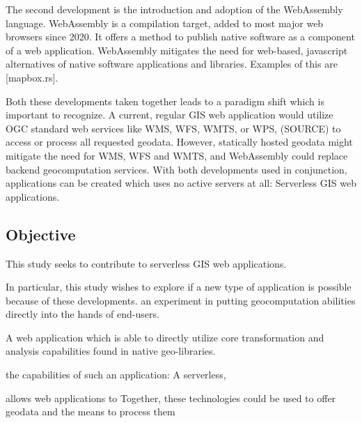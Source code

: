 The second development is the introduction and adoption of the WebAssembly language. 
WebAssembly is a compilation target, added to most major web browsers since 2020. 
It offers a method to publish native software as a component of a web application. 
WebAssembly mitigates the need for web-based, javascript alternatives of native software applications and libraries. 
Examples of this are [mapbox.rs].


Both these developments taken together leads to a paradigm shift which is important to recognize.
A current, regular GIS web application would utilize OGC standard web services like WMS, WFS, WMTS, or WPS, (SOURCE) to access or process all requested geodata. 
However, statically hosted geodata might mitigate the need for WMS, WFS and WMTS, and WebAssembly could replace backend geocomputation services.  
With both developments used in conjunction, applications can be created which uses no active servers at all: Serverless GIS web applications.


\subsection*{Objective}

This study seeks to contribute to serverless GIS web applications.

In particular, this study wishes to explore if a new type of application is possible because of these developments. 
an experiment in putting geocomputation abilities directly into the hands of end-users. 

A web application which is able to directly utilize core transformation and analysis capabilities found in native geo-libraries. 

the capabilities of such an application: A serverless, 






allows web applications to 
Together, these technologies could be used to offer geodata and the means to process them 



